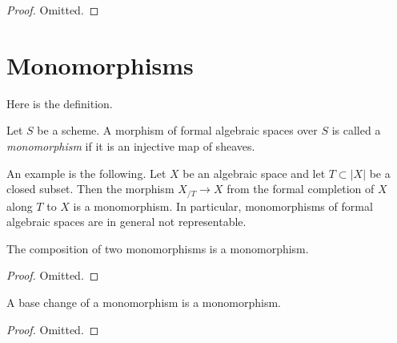 \begin{proof}
Omitted.
\end{proof}







\section{Monomorphisms}
\label{section-monomorphisms}

\noindent
Here is the definition.

\begin{definition}
\label{definition-monomorphism}
Let $S$ be a scheme.
A morphism of formal algebraic spaces over $S$ is called a
{\it monomorphism} if it is an injective map of sheaves.
\end{definition}

\noindent
An example is the following. Let $X$ be an algebraic space and let
$T \subset |X|$ be a closed subset. Then the morphism
$X_{/T} \to X$ from the formal completion of $X$ along $T$ to $X$
is a monomorphism. In particular, monomorphisms of formal algebraic
spaces are in general not representable.

\begin{lemma}
\label{lemma-composition-monomorphism}
The composition of two monomorphisms is a monomorphism.
\end{lemma}

\begin{proof}
Omitted.
\end{proof}

\begin{lemma}
\label{lemma-base-change-monomorphism}
A base change of a monomorphism is a monomorphism.
\end{lemma}

\begin{proof}
Omitted.
\end{proof}

